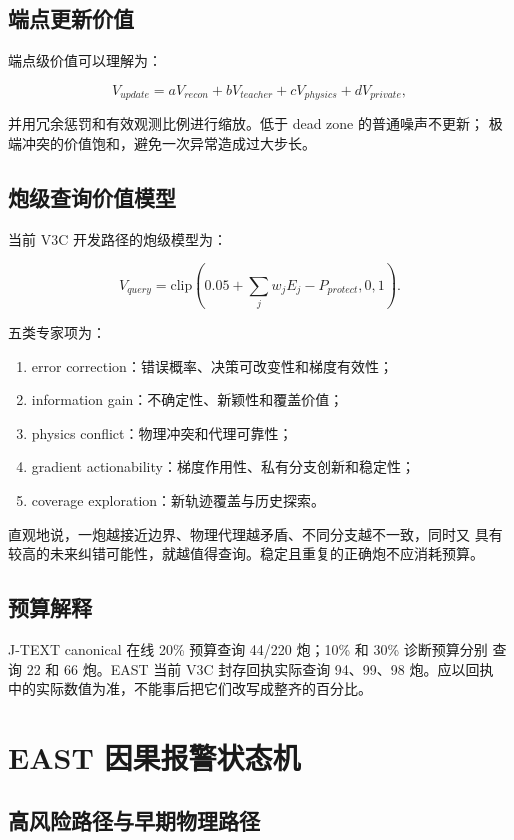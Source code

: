 \documentclass[11pt,a4paper]{article}
\begin{document}
\subsection{端点更新价值}

端点级价值可以理解为：

\[
V_{update}
=aV_{recon}+bV_{teacher}+cV_{physics}
+dV_{private},
\]

并用冗余惩罚和有效观测比例进行缩放。低于 dead zone 的普通噪声不更新；
极端冲突的价值饱和，避免一次异常造成过大步长。

\subsection{炮级查询价值模型}

当前 V3C 开发路径的炮级模型为：

\[
V_{query}
=\mathrm{clip}\left(
0.05+\sum_jw_jE_j-P_{protect},0,1\right).
\]

五类专家项为：

\begin{enumerate}
\item error correction：错误概率、决策可改变性和梯度有效性；
\item information gain：不确定性、新颖性和覆盖价值；
\item physics conflict：物理冲突和代理可靠性；
\item gradient actionability：梯度作用性、私有分支创新和稳定性；
\item coverage exploration：新轨迹覆盖与历史探索。
\end{enumerate}

直观地说，一炮越接近边界、物理代理越矛盾、不同分支越不一致，同时又
具有较高的未来纠错可能性，就越值得查询。稳定且重复的正确炮不应消耗预算。

\subsection{预算解释}

J-TEXT canonical 在线 20\% 预算查询 44/220 炮；10\% 和 30\% 诊断预算分别
查询 22 和 66 炮。EAST 当前 V3C 封存回执实际查询 94、99、98 炮。应以回执
中的实际数值为准，不能事后把它们改写成整齐的百分比。

\section{EAST 因果报警状态机}

\subsection{高风险路径与早期物理路径}
\end{document}
